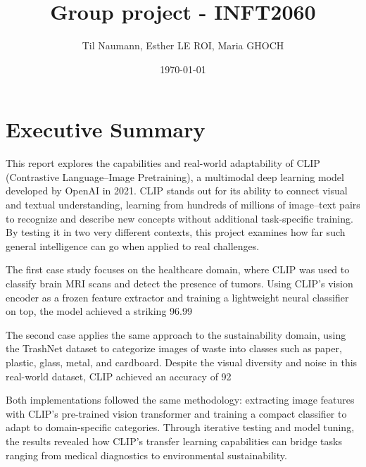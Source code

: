 \documentclass[12pt]{article}
\title{Group project - INFT2060}
\author{Til Naumann, Esther LE ROI, Maria GHOCH}
\date{\today}
\begin{document}
\maketitle
\newpage

\tableofcontents
\newpage

\section*{Executive Summary}

This report explores the capabilities and real-world adaptability of CLIP (Contrastive Language–Image Pretraining), a multimodal deep learning model developed by OpenAI in 2021. CLIP stands out for its ability to connect visual and textual understanding, learning from hundreds of millions of image–text pairs to recognize and describe new concepts without additional task-specific training. By testing it in two very different contexts, this project examines how far such general intelligence can go when applied to real challenges.

The first case study focuses on the healthcare domain, where CLIP was used to classify brain MRI scans and detect the presence of tumors. Using CLIP’s vision encoder as a frozen feature extractor and training a lightweight neural classifier on top, the model achieved a striking 96.99%

The second case applies the same approach to the sustainability domain, using the TrashNet dataset to categorize images of waste into classes such as paper, plastic, glass, metal, and cardboard. Despite the visual diversity and noise in this real-world dataset, CLIP achieved an accuracy of 92%

Both implementations followed the same methodology: extracting image features with CLIP’s pre-trained vision transformer and training a compact classifier to adapt to domain-specific categories. Through iterative testing and model tuning, the results revealed how CLIP’s transfer learning capabilities can bridge tasks ranging from medical diagnostics to environmental sustainability.
\end{document}
